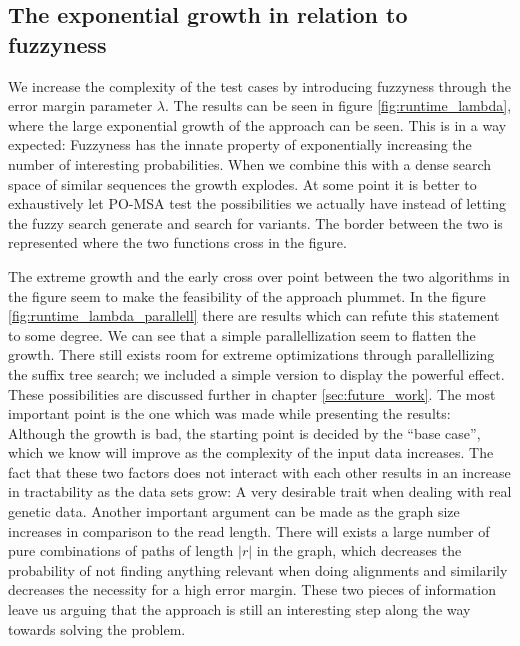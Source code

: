 \documentclass[thesis.tex]{subfiles}
\begin{document}
\subsection*{The exponential growth in relation to fuzzyness}
We increase the complexity of the test cases by introducing fuzzyness through the error margin parameter $\lambda$. The results can be seen in figure \ref{fig:runtime_lambda}, where the large exponential growth of the approach can be seen. This is in a way expected: Fuzzyness has the innate property of exponentially increasing the number of interesting probabilities. When we combine this with a dense search space of similar sequences the growth explodes. At some point it is better to exhaustively let PO-MSA test the possibilities we actually have instead of letting the fuzzy search generate and search for variants. The border between the two is represented where the two functions cross in the figure.\\
\par\noindent
The extreme growth and the early cross over point between the two algorithms in the figure seem to make the feasibility of the approach plummet. In the figure \ref{fig:runtime_lambda_parallell} there are results which can refute this statement to some degree. We can see that a simple parallellization seem to flatten the growth. There still exists room for extreme optimizations through parallellizing the suffix tree search; we included a simple version to display the powerful effect. These possibilities are discussed further in chapter \ref{sec:future_work}. The most important point is the one which was made while presenting the results: Although the growth is bad, the starting point is decided by the ``base case'', which we know will improve as the complexity of the input data increases. The fact that these two factors does not interact with each other results in an increase in tractability as the data sets grow: A very desirable trait when dealing with real genetic data. Another important argument can be made as the graph size increases in comparison to the read length. There will exists a large number of pure combinations of paths of length $|r|$ in the graph, which decreases the probability of not finding anything relevant when doing alignments and similarily decreases the necessity for a high error margin. These two pieces of information leave us arguing that the approach is still an interesting step along the way towards solving the problem.\\
\par\noindent
\end{document}
